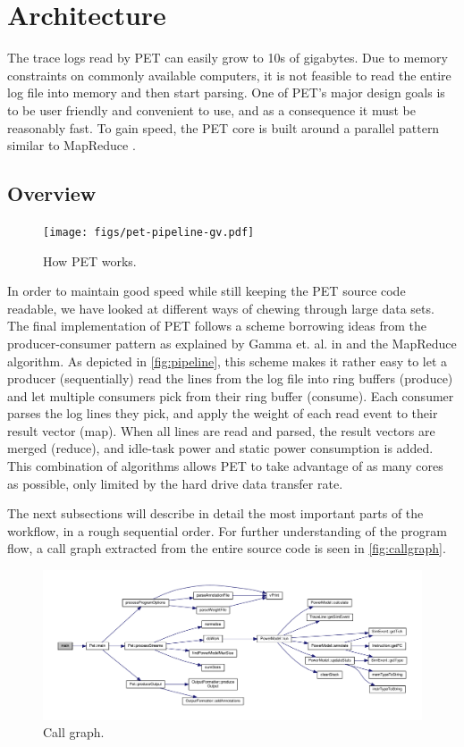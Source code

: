 \section{Architecture}

The trace logs read by PET can easily grow to 10s of gigabytes. Due to memory
constraints on commonly available computers, it is not feasible to read the
entire log file into memory and then start parsing. One of PET's major design
goals is to be user friendly and convenient to use, and as a consequence it must
be reasonably fast. To gain speed, the PET core is built around a parallel
pattern similar to MapReduce \cite{dean2008mapreduce}.


\subsection{Overview}

\begin{figure}[ht]
    \texttt{[image: figs/pet-pipeline-gv.pdf]}
    \caption{How PET works.}
    \label{fig:pipeline}
\end{figure}

In order to maintain good speed while still keeping the PET source code
readable, we have looked at different ways of chewing through large data sets.
The final implementation of PET follows a scheme borrowing ideas from the
producer-consumer pattern as explained by Gamma et. al. in \cite{designpatterns}
and the MapReduce algorithm. As depicted in \autoref{fig:pipeline}, this scheme
makes it rather easy to let a producer (sequentially) read the lines from the
log file into ring buffers (produce) and let multiple consumers pick from their
ring buffer (consume). Each consumer parses the log lines they pick, and apply
the weight of each read event to their result vector (map). When all lines are
read and parsed, the result vectors are merged (reduce), and idle-task power and
static power consumption is added. This combination of algorithms allows PET to
take advantage of as many cores as possible, only limited by the hard drive data
transfer rate.

The next subsections will describe in detail the most important parts of the
workflow, in a rough sequential order. For further understanding of the program
flow, a call graph extracted from the entire source code is seen in
\autoref{fig:callgraph}.

\begin{figure}
    \includegraphics[width=\textwidth]{figs/maincallgraph.pdf}
    \caption{Call graph.}
    \label{fig:callgraph}
\end{figure}


